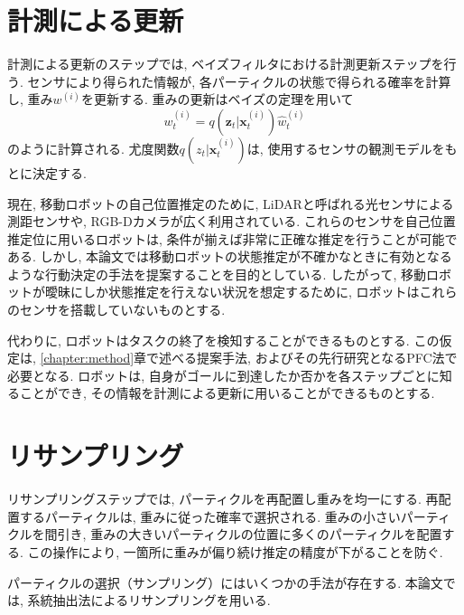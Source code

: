 \section{計測による更新}

計測による更新のステップでは, ベイズフィルタにおける計測更新ステップを行う. 
センサにより得られた情報が, 各パーティクルの状態で得られる確率を計算し, 重み$w^{(i)}$を更新する. 
重みの更新はベイズの定理を用いて
\begin{equation}
\label{weight}
  w^{(i)}_{t} = q(\bm{z}_{t} | \bm{x}^{(i)}_{t}) \hat{w}^{(i)}_{t}
\end{equation}
のように計算される. 
尤度関数$q(z_{t} | \bm{x}^{(i)}_{t})$は, 使用するセンサの観測モデルをもとに決定する. 

現在, 移動ロボットの自己位置推定のために, LiDARと呼ばれる光センサによる測距センサや, RGB-Dカメラが広く利用されている. 
これらのセンサを自己位置推定位に用いるロボットは, 条件が揃えば非常に正確な推定を行うことが可能である. 
しかし, 本論文では移動ロボットの状態推定が不確かなときに有効となるような行動決定の手法を提案することを目的としている. 
したがって, 移動ロボットが曖昧にしか状態推定を行えない状況を想定するために, ロボットはこれらのセンサを搭載していないものとする. 

代わりに, ロボットはタスクの終了を検知することができるものとする. 
この仮定は, \ref{chapter:method}章で述べる提案手法, およびその先行研究となるPFC法で必要となる. 
ロボットは, 自身がゴールに到達したか否かを各ステップごとに知ることができ, その情報を計測による更新に用いることができるものとする. 

\section{リサンプリング}
リサンプリングステップでは, パーティクルを再配置し重みを均一にする. 
再配置するパーティクルは, 重みに従った確率で選択される. 
重みの小さいパーティクルを間引き, 重みの大きいパーティクルの位置に多くのパーティクルを配置する. 
この操作により, 一箇所に重みが偏り続け推定の精度が下がることを防ぐ. 

パーティクルの選択（サンプリング）にはいくつかの手法が存在する. 
本論文では, 系統抽出法によるリサンプリングを用いる. 
